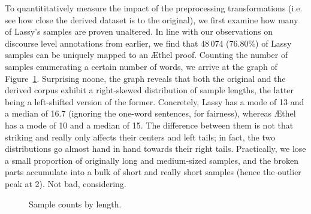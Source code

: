 To quantititatively measure the impact of the preprocessing transformations (i.e. see how close the derived dataset is to the original), we first examine how many of Lassy's samples are proven unaltered.
In line with our observations on discourse level annotations from earlier, we find that 48\,074 (76.80\%) of Lassy samples can be uniquely mapped to an \AE thel proof.
Counting the number of samples enumerating a certain number of words, we arrive at the graph of Figure~\ref{figure:count_lens}.
Surprising noone, the graph reveals that both the original and the derived corpus exhibit a right-skewed distribution of sample lengths, the latter being a left-shifted version of the former.
Concretely, Lassy has a mode of 13 and a median of 16.7 (ignoring the one-word sentences, for fairness), whereas \AE thel has a mode of 10 and a median of 15.
The difference between them is not that striking and really only affects their centers and left tails; in fact, the two distributions go almost hand in hand towards their right tails.
Practically, we lose a small proportion of originally long and medium-sized samples, and the broken parts accumulate into a bulk of short and really short samples (hence the outlier peak at 2).
Not bad, considering.


\begin{figure}
	\centering
	\caption{Sample counts by length.}
	\label{figure:count_lens}
\end{figure}


